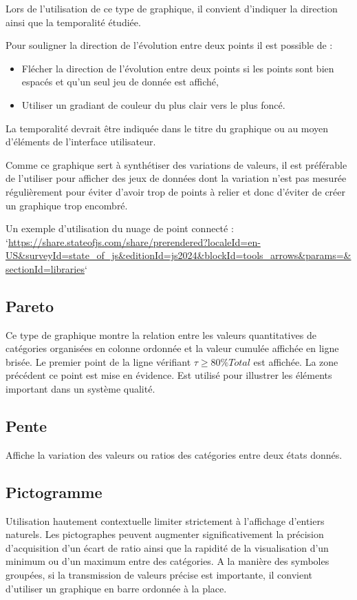 \documentclass[a4paper,12pt]{article}
\begin{document}
\begin{multicols}{2}
Lors de l'utilisation de ce type de graphique, il convient d'indiquer la direction ainsi que la temporalité étudiée. \autocite{wilkeVisualizingTimeSeries2019}

Pour souligner la direction de l'évolution entre deux points il est possible de :
\begin{itemize}
\item Flécher la direction de l'évolution entre deux points si les points sont bien espacés et qu'un seul jeu de donnée est affiché, \autocite{jonathanschwabishComparingCategories2021}
\item Utiliser un gradiant de couleur du plus clair vers le plus foncé.\autocite{wilkeVisualizingTimeSeries2019}
\end{itemize}

La temporalité devrait être indiquée dans le titre du graphique ou au moyen d'éléments de l'interface utilisateur.

Comme ce graphique sert à synthétiser des variations de valeurs, il est préférable de l'utiliser pour afficher des jeux de données dont la variation n'est pas mesurée régulièrement pour éviter d'avoir trop de points à relier et donc d'éviter de créer un graphique trop encombré. \autocite{jonathanschwabishComparingCategories2021}

Un exemple d'utilisation du nuage de point connecté : `\url{https://share.stateofjs.com/share/prerendered?localeId=en-US\&surveyId=state\_of\_js\&editionId=js2024\&blockId=tools\_arrows\&params=\&sectionId=libraries}`
\subsection*{Pareto}
\label{sec:org4f773d9}
Ce type de graphique montre la relation entre les valeurs quantitatives de catégories organisées en colonne ordonnée et la valeur cumulée affichée en ligne brisée. Le premier point de la ligne vérifiant \(\tau\geq80\%Total\) est affichée. La zone précédent ce point est mise en évidence.
Est utilisé pour illustrer les éléments important dans un système qualité.
\subsection*{Pente}
\label{sec:org1fced66}
Affiche la variation des valeurs ou ratios des catégories entre deux états donnés. \autocite{alansmithLexiqueVisuel}
\subsection*{Pictogramme}
\label{sec:org7d6754e}
Utilisation hautement contextuelle limiter strictement à l'affichage d'entiers naturels. \autocite{alansmithLexiqueVisuel}
Les pictographes peuvent augmenter significativement la précision d'acquisition d'un écart de ratio ainsi que la rapidité de la visualisation d'un minimum ou d'un maximum entre des catégories. \autocite{tranDiscoveringAccessibleData2024} A la manière des symboles groupées, si la transmission de valeurs précise est importante, il convient d'utiliser un graphique en barre ordonnée à la place. \autocite{tranDiscoveringAccessibleData2024}

\end{multicols}
\end{document}
